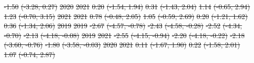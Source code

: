 \documentclass[
  letterpaper,
  DIV=11,
  numbers=noendperiod]{scrartcl}
\providecommand{\DIFdel}[1]{{\protect\color{red}\sout{#1}}}                      %
\providecommand{\DIFdelFL}[1]{\DIFdel{#1}} %
\begin{document}
\DIFdelFL{-1.50 }%
\DIFdelFL{(-3.28, 0.27)}%
\DIFdelFL{\hspace{1em}2020 }%
\DIFdelFL{2021 }%
\DIFdelFL{0.20 }%
\DIFdelFL{(-1.54, 1.94) }%
\DIFdelFL{0.31 }%
\DIFdelFL{(-1.43, 2.04) }%
\DIFdelFL{1.14 }%
\DIFdelFL{(-0.65, 2.94) }%
\DIFdelFL{1.23 }%
\DIFdelFL{(-0.70, 3.15)}%
\DIFdelFL{\hspace{1em}2021 }%
\DIFdelFL{2021 }%
\DIFdelFL{0.78 }%
\DIFdelFL{(-0.48, 2.05) }%
\DIFdelFL{1.05 }%
\DIFdelFL{(-0.59, 2.69) }%
\DIFdelFL{0.20 }%
\DIFdelFL{(-1.21, 1.62) }%
\DIFdelFL{0.36 }%
\DIFdelFL{(-1.34, 2.06)}%
\DIFdelFL{\hspace{1em}2019 }%
\DIFdelFL{2019 }%
\DIFdelFL{-2.67 }%
\DIFdelFL{(-4.57, -0.78) }%
\DIFdelFL{-2.43 }%
\DIFdelFL{(-4.58, -0.28) }%
\DIFdelFL{-2.52 }%
\DIFdelFL{(-4.34, -0.70) }%
\DIFdelFL{-2.13 }%
\DIFdelFL{(-4.18, -0.08)}%
\DIFdelFL{\hspace{1em}2019 }%
\DIFdelFL{2021 }%
\DIFdelFL{-2.55 }%
\DIFdelFL{(-4.15, -0.94) }%
\DIFdelFL{-2.20 }%
\DIFdelFL{(-4.18, -0.22) }%
\DIFdelFL{-2.18 }%
\DIFdelFL{(-3.60, -0.76) }%
\DIFdelFL{-1.80 }%
\DIFdelFL{(-3.58, -0.03)}%
\DIFdelFL{\hspace{1em}2020 }%
\DIFdelFL{2021 }%
\DIFdelFL{0.11 }%
\DIFdelFL{(-1.67, 1.90) }%
\DIFdelFL{0.22 }%
\DIFdelFL{(-1.58, 2.01) }%
\DIFdelFL{1.07 }%
\DIFdelFL{(-0.74, 2.87) }%
\end{document}
